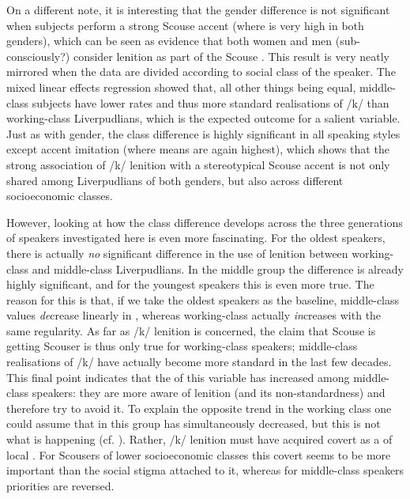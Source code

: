 On a different note, it is interesting that the gender difference is not significant when subjects perform a strong Scouse accent (where  is very high in both genders), which can be seen as evidence that both women and men (sub-consciously?) consider lenition as part of the Scouse .
This result is very neatly mirrored when the data are divided according to social class of the speaker.
The mixed linear effects regression showed that, all other things being equal, middle-class subjects have lower  rates and thus more standard realisations of /k/ than working-class Liverpudlians, which is the expected outcome for a salient variable.
Just as with gender, the class difference is highly significant in all speaking styles except accent imitation (where  means are again highest), which shows that the strong association of /k/ lenition with a stereotypical Scouse accent is not only shared among Liverpudlians of both genders, but also across different socioeconomic classes.

However, looking at how the class difference develops across the three generations of speakers investigated here is even more fascinating.
For the oldest speakers, there is actually \emph{no} significant difference in the use of lenition between working-class and middle-class Liverpudlians.
In the middle group the difference is already highly significant, and for the youngest speakers this is even more true.
The reason for this is that, if we take the oldest speakers as the baseline, middle-class  values \emph{de}crease linearly in , whereas working-class  actually \emph{in}creases with the same regularity.
As far as /k/ lenition is concerned, the claim that Scouse is getting Scouser is thus only true for working-class speakers; middle-class realisations of /k/ have actually become more standard in the last few decades.
This final point indicates that the  of this variable has increased among middle-class speakers: they are more aware of lenition (and its non-standardness) and therefore try to avoid it.
To explain the opposite trend in the working class one could assume that  in this group has simultaneously decreased, but this is not what is happening (cf. ).
Rather, /k/ lenition must have acquired covert  as a  of local .
For Scousers of lower socioeconomic classes this covert  seems to be more important than the social stigma attached to it, whereas for middle-class speakers priorities are reversed.

